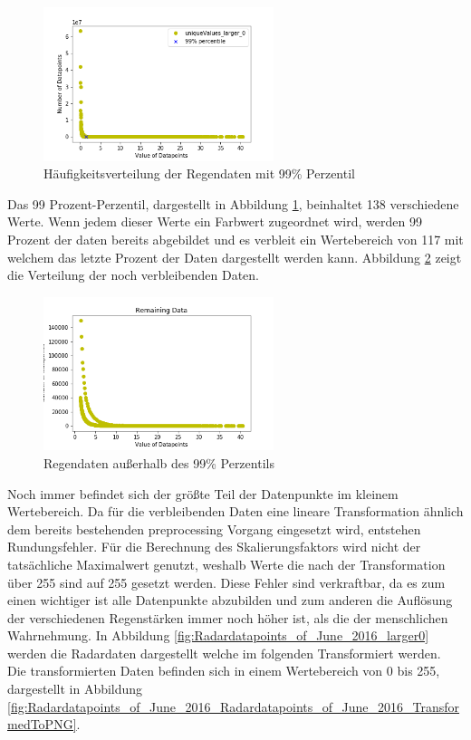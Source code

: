 \begin{figure}[H]
    \centering
    \includegraphics[width=0.6\textwidth,angle=0]{abb/Radardatapoints_of_June_2016_larger0_99percentile.png}
    \caption[Datenaufbereitung]{Häufigkeitsverteilung der Regendaten mit 99\% Perzentil}
    \label{fig:Radardatapoints_of_June_2016_larger0_99percentile}
\end{figure}

Das 99 Prozent-Perzentil, dargestellt in Abbildung \ref{fig:Radardatapoints_of_June_2016_larger0_99percentile}, beinhaltet 138 verschiedene Werte. Wenn jedem dieser Werte ein Farbwert zugeordnet wird, werden 99 Prozent der daten bereits abgebildet und es verbleit ein Wertebereich von 117 mit welchem das letzte Prozent der Daten dargestellt werden kann.
Abbildung \ref{fig:Radardatapoints_of_June_2016_RemainingData} zeigt die Verteilung der noch verbleibenden Daten.

\begin{figure}[H]
    \centering
    \includegraphics[width=0.6\textwidth,angle=0]{abb/Radardatapoints_of_June_2016_RemainingData.png}
    \caption[Datenaufbereitung]{Regendaten außerhalb des 99\% Perzentils}
    \label{fig:Radardatapoints_of_June_2016_RemainingData}
\end{figure}

Noch immer befindet sich der größte Teil der Datenpunkte im kleinem Wertebereich.
Da für die verbleibenden Daten eine lineare Transformation ähnlich dem bereits bestehenden preprocessing Vorgang eingesetzt wird, entstehen Rundungsfehler.
Für die Berechnung des Skalierungsfaktors wird nicht der tatsächliche Maximalwert genutzt, weshalb Werte die nach der Transformation über 255 sind auf 255 gesetzt werden.
Diese Fehler sind verkraftbar, da es zum einen wichtiger ist alle Datenpunkte abzubilden und zum anderen die Auflösung der verschiedenen Regenstärken immer noch höher ist, als die der menschlichen Wahrnehmung.
In Abbildung \ref{fig:Radardatapoints_of_June_2016_larger0} werden die Radardaten dargestellt welche im folgenden Transformiert werden.
Die transformierten Daten befinden sich in einem Wertebereich von 0 bis 255, dargestellt in Abbildung \ref{fig:Radardatapoints_of_June_2016_Radardatapoints_of_June_2016_TransformedToPNG}.

